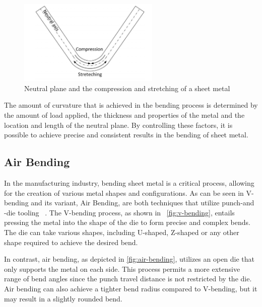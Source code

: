 \begin{figure}[h]
    \begin{tcolorbox}[arc=0pt,boxrule=0.5pt, colback=white]
        \centering
        \includegraphics[width=0.6\textwidth]{chap2/images/neutral-plane}
    \end{tcolorbox}
    \caption{Neutral plane and the compression and stretching of a sheet metal
    ~\cite[p. 3]{baig2021machine}}
    \label{fig:neutral-plane}
\end{figure}

The amount of curvature that is achieved in the bending process is determined by the
amount of load applied, the thickness and properties of the metal and the location and length of the neutral plane.
By controlling these factors, it is possible to achieve precise and consistent results in the bending of sheet metal.

\subsection{Air Bending}\label{subsec:air-bending}
In the manufacturing industry, bending sheet metal is a critical process, allowing for the creation of various metal
shapes and configurations.
As can be seen in \cite{groover2020fundamentals} V-bending and its variant, Air Bending, are both techniques that
utilize punch-and
-die tooling ~\cite[p. 416]{groover2020fundamentals}.
The V-bending process, as shown in ~\cref{fig:v-bending}, entails pressing the metal into the shape of the die
to form precise and complex bends.
The die can take various shapes, including U-shaped, Z-shaped or any other shape required to achieve the desired bend.

In contrast, air bending, as depicted in \cref{fig:air-bending}, utilizes an open die that only supports the
metal on each side.
This process permits a more extensive range of bend angles since the punch travel distance is not
restricted by the die.
Air bending can also achieve a tighter bend radius compared to V-bending, but it may result in
a slightly rounded bend.

